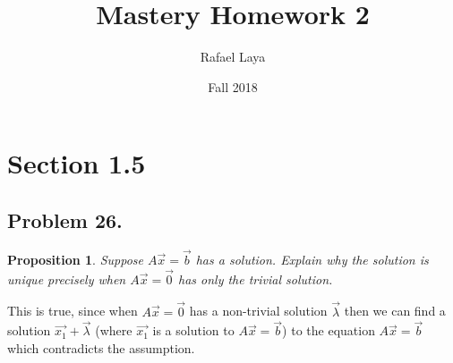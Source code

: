 \documentclass[12pt, letterpaper]{article}
\title{Mastery Homework 2}
\author{Rafael Laya}
\date{Fall 2018}
\theoremstyle{statement}
\newtheorem*{atmProp}{Proposition}
\begin{document}
    \maketitle

    \section*{Section 1.5}
        \subsection*{Problem 26.} 
            \begin{atmProp}
                Suppose $A\Vec{x} = \Vec{b}$ has a solution. Explain why the solution is unique precisely when $A\Vec{x}= \Vec{0}$ has only the trivial solution.
            \end{atmProp}
            
            This is true, since when $A\vec{x}=\vec{0}$ has a non-trivial solution $\vec{\lambda}$ then we can find a solution $\vec{x_1} + \vec{\lambda}$ (where $\vec{x_1}$ is a solution to $A\vec{x}=\vec{b}$) to the equation $A\vec{x}=\vec{b}$ which contradicts the assumption.
            
\end{document}
